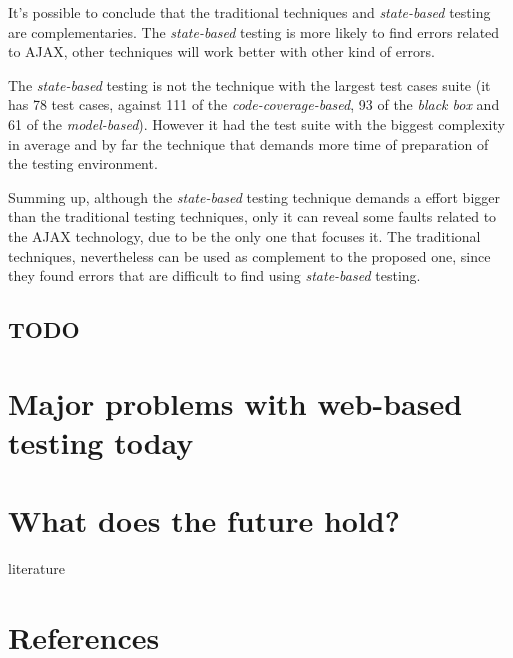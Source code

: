 \documentclass[a4paper]{article}
\begin{document}
It's possible to conclude that the traditional techniques and \emph{state-based} testing are complementaries.
The \emph{state-based} testing is more likely to find errors related to AJAX, other techniques will work better with other kind of errors.

The \emph{state-based} testing is not the technique with the largest test cases suite (it has 78 test cases, against 111 of the \emph{code-coverage-based}, 93 of the \emph{black box} and 61 of the \emph{model-based}).
However it had the test suite with the biggest complexity in average and by far the technique that demands more time of preparation of the testing environment.

Summing up, although the \emph{state-based} testing technique demands a effort bigger than the traditional testing techniques, only it can reveal some faults related to the AJAX technology, due to be the only one that focuses it.
The traditional techniques, nevertheless can be used as complement to the proposed one, since they found errors that are difficult to find using \emph{state-based} testing.

\subsection{TODO}

\section{Major problems with web-based testing today}

\section{What does the future hold?}

\newpage
\appendix

\begin{btSect}[alpha]{literature}
\section{References}
\btPrintAll
\end{btSect}
\end{document}
